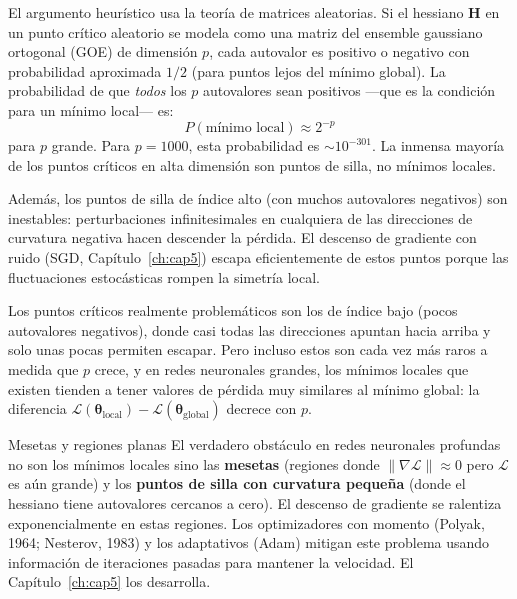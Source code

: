 El argumento heurístico usa la teoría de matrices aleatorias. Si el
hessiano $\bm{H}$ en un punto crítico aleatorio se modela como una
matriz del ensemble gaussiano ortogonal (GOE) de dimensión $p$, cada
autovalor es positivo o negativo con probabilidad aproximada $1/2$
(para puntos lejos del mínimo global). La probabilidad de que
\emph{todos} los $p$ autovalores sean positivos —que es la condición
para un mínimo local— es:
\begin{equation}
  P(\text{mínimo local}) \approx 2^{-p}
  \label{eq:prob_minimo}
\end{equation}
para $p$ grande. Para $p = 1000$, esta probabilidad es $\sim 10^{-301}$.
La inmensa mayoría de los puntos críticos en alta dimensión son puntos
de silla, no mínimos locales.

Además, los puntos de silla de índice alto (con muchos autovalores
negativos) son inestables: perturbaciones infinitesimales en cualquiera
de las direcciones de curvatura negativa hacen descender la pérdida. El
descenso de gradiente con ruido (SGD, Capítulo~\ref{ch:cap5}) escapa
eficientemente de estos puntos porque las fluctuaciones estocásticas
rompen la simetría local.

Los puntos críticos realmente problemáticos son los de índice bajo
(pocos autovalores negativos), donde casi todas las direcciones apuntan
hacia arriba y solo unas pocas permiten escapar. Pero incluso estos son
cada vez más raros a medida que $p$ crece, y en redes neuronales
grandes, los mínimos locales que existen tienden a tener valores de
pérdida muy similares al mínimo global: la diferencia
$\mathcal{L}(\bm{\theta}_{\text{local}}) -
\mathcal{L}(\bm{\theta}_{\text{global}})$ decrece con $p$.

\begin{observacion}{Mesetas y regiones planas}
El verdadero obstáculo en redes neuronales profundas no son los mínimos
locales sino las \textbf{mesetas} (regiones donde
$\|\nabla\mathcal{L}\| \approx 0$ pero $\mathcal{L}$ es aún grande) y
los \textbf{puntos de silla con curvatura pequeña} (donde el hessiano
tiene autovalores cercanos a cero). El descenso de gradiente se ralentiza
exponencialmente en estas regiones. Los optimizadores con momento
(Polyak, 1964; Nesterov, 1983) y los adaptativos (Adam) mitigan este
problema usando información de iteraciones pasadas para mantener la
velocidad. El Capítulo~\ref{ch:cap5} los desarrolla.
\end{observacion}

